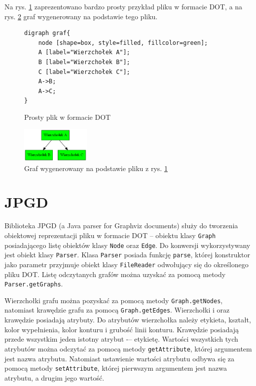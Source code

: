 Na rys. \ref{fig:dot_example} zaprezentowano bardzo prosty przykład pliku w formacie DOT, a na rys. \ref{fig:dot_graph} graf wygenerowany na podstawie tego pliku.

\begin{figure}[H]
\begin{verbatim}
digraph graf{
    node [shape=box, style=filled, fillcolor=green];
    A [label="Wierzchołek A"];
    B [label="Wierzchołek B"];
    C [label="Wierzchołek C"];
    A->B;
    A->C;
}
\end{verbatim}
\caption{Prosty plik w formacie DOT}
\label{fig:dot_example}
\end{figure}


\begin{figure}[H]
\begin{center}
\includegraphics[width=0.3\textwidth]{img/graf.png}
\end{center}
\caption{Graf wygenerowany na podstawie pliku z rys. \ref{fig:dot_example}}
\label{fig:dot_graph}
\end{figure}

\section{JPGD}

Biblioteka JPGD (a Java parser for Graphviz documents) \cite{JPGD} służy do tworzenia obiektowej reprezentacji pliku w formacie DOT -- obiektu klasy \texttt{Graph} posiadającego listę obiektów klasy \texttt{Node} oraz \texttt{Edge}. Do konwersji wykorzystywany jest obiekt klasy \texttt{Parser}. Klasa \texttt{Parser} posiada funkcję \texttt{parse}, której konstruktor jako parametr przyjmuje obiekt klasy \texttt{FileReader} odwołujący się do określonego pliku DOT. Listę odczytanych grafów można uzyskać za pomocą metody \texttt{Parser.get\-Graphs}.

Wierzchołki grafu można pozyskać za pomocą metody \texttt{Graph.getNodes}, natomiast  krawędzie grafu za pomocą \texttt{Graph.getEdges}. Wierzchołki i oraz krawędzie posiadają atrybuty. Do atrybutów wierzchołka należy etykieta, kształt, kolor wypełnienia, kolor konturu i grubość linii konturu. Krawędzie posiadają przede wszystkim jeden istotny atrybut -– etykietę. Wartości wszystkich tych atrybutów można odczytać za pomocą metody \texttt{getAttribute}, której argumentem jest nazwa atrybutu. Natomiast ustawienie  wartości atrybutu odbywa się za pomocą metody \texttt{setAttribute}, której pierwszym argumentem jest nazwa atrybutu, a drugim jego wartość. 

